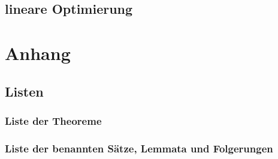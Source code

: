 \documentclass[ngerman,a4paper,order=firstname]{../../texmf/tex/latex/mathscript/mathscript}
\begin{document}
\chapter{lineare Optimierung}






\part*{Anhang}
\appendix

\chapter{Listen}
\section{Liste der Theoreme}

\pagebreak
\section{Liste der benannten Sätze, Lemmata und Folgerungen}


\printindex
\end{document}
